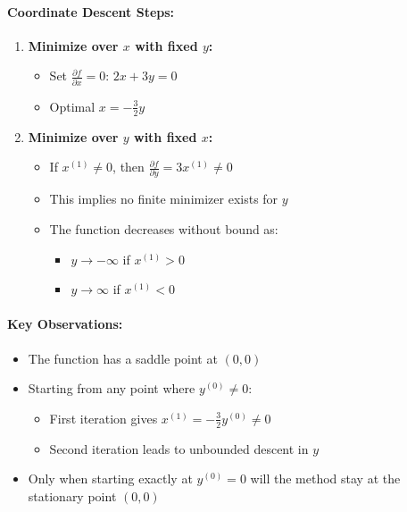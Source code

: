 \documentclass{article}
\begin{document}
\paragraph{Coordinate Descent Steps:}
\begin{enumerate}
    \item \textbf{Minimize over $x$ with fixed $y$:}
    \begin{itemize}
        \item Set $\frac{\partial f}{\partial x} = 0$: $2x + 3y = 0$
        \item Optimal $x = -\frac{3}{2}y$
    \end{itemize}

    \item \textbf{Minimize over $y$ with fixed $x$:}
    \begin{itemize}
        \item If $x^{(1)} \neq 0$, then $\frac{\partial f}{\partial y} = 3x^{(1)} \neq 0$
        \item This implies no finite minimizer exists for $y$
        \item The function decreases without bound as:
        \begin{itemize}
            \item $y \rightarrow -\infty$ if $x^{(1)} > 0$
            \item $y \rightarrow \infty$ if $x^{(1)} < 0$
        \end{itemize}
    \end{itemize}
\end{enumerate}

\paragraph{Key Observations:}
\begin{itemize}
    \item The function has a saddle point at $(0,0)$
    \item Starting from any point where $y^{(0)} \neq 0$:
    \begin{itemize}
        \item First iteration gives $x^{(1)} = -\frac{3}{2}y^{(0)} \neq 0$
        \item Second iteration leads to unbounded descent in $y$
    \end{itemize}
    \item Only when starting exactly at $y^{(0)} = 0$ will the method stay at the stationary point $(0,0)$
\end{itemize}
\end{document}
